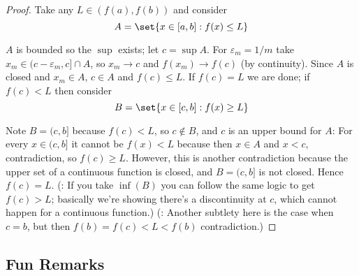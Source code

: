 \documentclass{article}
\begin{document}
\begin{proof}
  Take any $L \in (f(a), f(b))$ and consider
  \[
    A = \set{x \in [a, b]: f(x) \le L}
  \]

  $A$ is bounded so the $\sup$ exists; let $c = \sup A$. For $\varepsilon_m = 1/m$ take $x_m \in (c - \varepsilon_m, c] \cap A$, so $x_m \to c$ and $f(x_m) \to f(c)$ (by continuity). Since $A$ is closed and $x_m \in A$, $c \in A$ and $f(c) \le L$. If $f(c) = L$ we are done; if $f(c) < L$ then consider
  \[
    B = \set{x \in [c, b]: f(x) \ge L}
  \]

  Note $B = (c, b]$ because $f(c) < L$, so $c \notin B$, and $c$ is an upper bound for $A$: For every $x \in (c, b]$ it cannot be $f(x) < L$ because then $x \in A$ and $x < c$, contradiction, so $f(c) \ge L$. However, this is another contradiction because the upper set of a continuous function is closed, and $B = (c, b]$ is not closed. Hence $f(c) = L$. (\NB: If you take $\inf(B)$ you can follow the same logic to get $f(c) > L$; basically we're showing there's a discontinuity at $c$, which cannot happen for a continuous function.) (\NB: Another subtlety here is the case when $c = b$, but then $f(b) = f(c) < L < f(b)$ contradiction.)
\end{proof}

\subsection{Fun Remarks}
\label{sub:fun_remarks}
\end{document}
